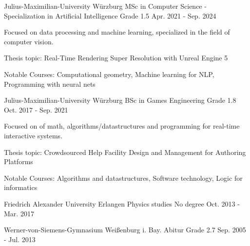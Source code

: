 

\begin{cventries}

  \cventry
    {Julius-Maximilian-University Würzburg} %
    {MSc in Computer Science - Specialization in Artificial Intelligence} %
    {Grade 1.5} %
    {Apr. 2021 - Sep. 2024} %
    {
      \begin{cvitems} %
        \item {Focused on data processing and machine learning, specialized in the field of computer vision.}
        \item {Thesis topic: Real-Time Rendering Super Resolution with Unreal Engine 5}
        \item {Notable Courses: Computational geometry, Machine learning for NLP, Programming with neural nets}
      \end{cvitems}
    }

  \cventry
    {Julius-Maximilian-University Würzburg} %
    {BSc in Games Engineering} %
    {Grade 1.8} %
    {Oct. 2017 - Sep. 2021} %
    {
      \begin{cvitems} %
        \item {Focused on of math, algorithms/datastructures and programming for real-time interactive systems.}
        \item {Thesis topic: Crowdsourced Help Facility Design and Management for Authoring Platforms}
        \item {Notable Courses: Algorithms and datastructures, Software technology, Logic for informatics}
      \end{cvitems}
    }

\cventry
{Friedrich Alexander University Erlangen} %
{Physics studies} %
{No degree} %
{Oct. 2013 - Mar. 2017} %
{}

\cventry
{Werner-von-Siemens-Gymnasium Weißenburg i. Bay.} %
{Abitur} %
{Grade 2.7} %
{Sep. 2005 - Jul. 2013} %
{}

\end{cventries}
